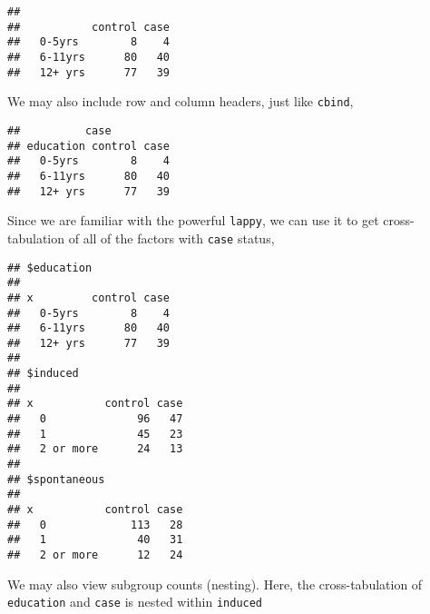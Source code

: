 \documentclass[]{book}
\newenvironment{Shaded}{\begin{snugshade}}{\end{snugshade}}
\newcommand{\KeywordTok}[1]{\textcolor[rgb]{0.13,0.29,0.53}{\textbf{{#1}}}}
\newcommand{\DataTypeTok}[1]{\textcolor[rgb]{0.13,0.29,0.53}{{#1}}}
\newcommand{\StringTok}[1]{\textcolor[rgb]{0.31,0.60,0.02}{{#1}}}
\newcommand{\NormalTok}[1]{{#1}}
\theoremstyle{definition}
\theoremstyle{definition}
\theoremstyle{remark}
\begin{document}
\begin{verbatim}
##          
##           control case
##   0-5yrs        8    4
##   6-11yrs      80   40
##   12+ yrs      77   39
\end{verbatim}

We may also include row and column headers, just like \texttt{cbind},

\begin{Shaded}
\end{Shaded}

\begin{verbatim}
##          case
## education control case
##   0-5yrs        8    4
##   6-11yrs      80   40
##   12+ yrs      77   39
\end{verbatim}

Since we are familiar with the powerful \texttt{lappy}, we can use it to
get cross-tabulation of all of the factors with \texttt{case} status,

\begin{Shaded}
\end{Shaded}

\begin{verbatim}
## $education
##          
## x         control case
##   0-5yrs        8    4
##   6-11yrs      80   40
##   12+ yrs      77   39
## 
## $induced
##            
## x           control case
##   0              96   47
##   1              45   23
##   2 or more      24   13
## 
## $spontaneous
##            
## x           control case
##   0             113   28
##   1              40   31
##   2 or more      12   24
\end{verbatim}

We may also view subgroup counts (nesting). Here, the cross-tabulation
of \texttt{education} and \texttt{case} is nested within
\texttt{induced}

\begin{Shaded}
\end{Shaded}
\end{document}
